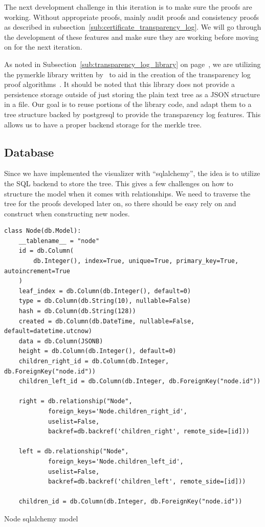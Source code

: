 \documentclass[../Main/thesis.tex]{subfiles}
\begin{document}
The next development challenge in this iteration is to make sure the proofs are
working. Without appropriate proofs, mainly audit proofs and consistency proofs
as described in subsection~\ref{sub:certificate_transparency_log}. We will go
through the development of these features and make sure they are working before
moving on for the next iteration.

As noted in Subsection~\ref{sub:transparency_log_library} on
page~\pageref{sub:transparency_log_library}, we are utilizing the pymerkle 
library written by~\citeauthor{pymerkeltools} to aid in the creation of the
transparency log proof algorithms~\cite{pymerkeltools}. It should be noted that
this library does not provide a persistence storage outside of just storing the
plain text tree as a JSON structure in a file. Our goal is to reuse portions of
the library code, and adapt them to a tree structure backed by postgresql to
provide the transparency log features. This allows us to have a proper backend
storage for the merkle tree.


\subsection*{Database}%
\label{sub:database}
Since we have implemented the visualizer with ``sqlalchemy'', the idea is to
utilize the SQL backend to store the tree. This gives a few challenges on how to
structure the model when it comes with relationships. We need to traverse the
tree for the proofs developed later on, so there should be easy rely on and
construct when constructing new nodes.

\begin{listing}[H]
\begin{verbatim}
class Node(db.Model):
    __tablename__ = "node"
    id = db.Column(
        db.Integer(), index=True, unique=True, primary_key=True, autoincrement=True
    )
    leaf_index = db.Column(db.Integer(), default=0)
    type = db.Column(db.String(10), nullable=False)
    hash = db.Column(db.String(128))
    created = db.Column(db.DateTime, nullable=False, default=datetime.utcnow)
    data = db.Column(JSONB)
    height = db.Column(db.Integer(), default=0)
    children_right_id = db.Column(db.Integer, db.ForeignKey("node.id"))
    children_left_id = db.Column(db.Integer, db.ForeignKey("node.id"))

    right = db.relationship("Node",
            foreign_keys='Node.children_right_id',
            uselist=False,
            backref=db.backref('children_right', remote_side=[id]))

    left = db.relationship("Node", 
            foreign_keys='Node.children_left_id',
            uselist=False,
            backref=db.backref('children_left', remote_side=[id]))

    children_id = db.Column(db.Integer, db.ForeignKey("node.id"))
\end{verbatim}
\caption{Node sqlalchemy model}
\label{lst:node_model}
\end{listing}
\end{document}
